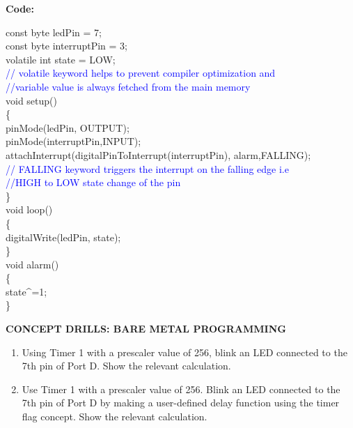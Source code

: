 \documentclass[12pt,a4paper]{article}
\begin{document}
\hspace{1.5cm}\textbf{\large Code:}\\[6pt]
\setlength{\parindent}{8eM}


const byte ledPin = 7;\\
const byte interruptPin = 3;\\
volatile int state = LOW;\\
\textcolor{blue}{// volatile keyword helps to prevent compiler optimization and\\
//variable value is always fetched from the main memory}\\[14pt]

void setup()\\
\{\\
  pinMode(ledPin, OUTPUT);\\
  pinMode(interruptPin,INPUT);\\
  attachInterrupt(digitalPinToInterrupt(interruptPin), alarm,FALLING);\\
  \textcolor{blue}{// FALLING keyword triggers the interrupt on the falling edge i.e\\
//HIGH to LOW state change of the pin}\\
\}\\[14pt]

void loop()\\
\{\\
  digitalWrite(ledPin, state);\\
\}\\[14pt]
void alarm()\\
\{\\
  state^=1;\\
\}\\





\vspace{30mm}

\setlength{\parindent}{0eM}
\begin{justify}
\begin{center} \textbf{\large CONCEPT DRILLS: BARE METAL PROGRAMMING }\end{center}
\vspace{-3mm}
\begin{enumerate}
 \setlength\itemsep{-0.3em}
\item Using Timer 1 with a prescaler value of 256, blink an LED connected to the 7th pin of Port D. Show the relevant calculation.
\item Use Timer 1 with a prescaler value of 256. Blink an LED connected to the 7th pin of Port D by making a user-defined delay function using the timer flag concept. Show the relevant calculation.

\end{enumerate}
\end{justify}
\end{document}
